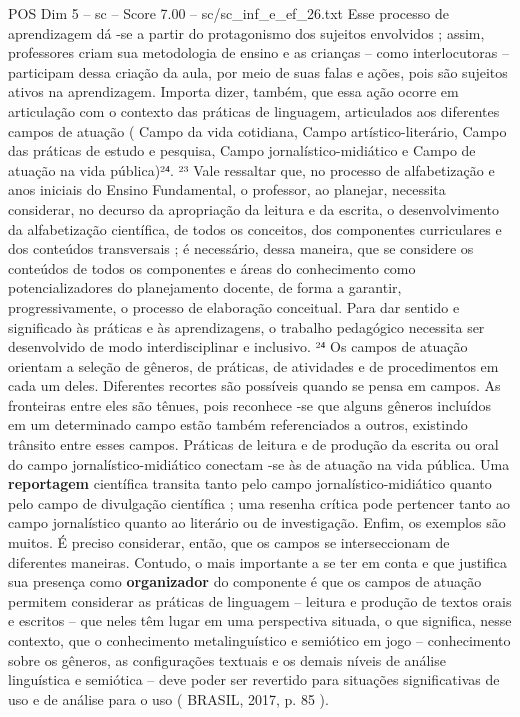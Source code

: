 \begin{textsample}{POS Dim 5 – sc – Score 7.00 – sc/sc\_inf\_e\_ef\_26.txt}
Esse processo de aprendizagem dá -se a partir do protagonismo dos sujeitos envolvidos ; assim, professores criam sua metodologia de ensino e as crianças – como interlocutoras – participam dessa criação da aula, por meio de suas falas e ações, pois são sujeitos ativos na aprendizagem.
Importa dizer, também, que essa ação ocorre em articulação com o contexto das práticas de linguagem, articulados aos diferentes campos de atuação ( Campo da vida cotidiana, Campo artístico-literário, Campo das práticas de estudo e pesquisa, Campo jornalístico-midiático e Campo de atuação na vida pública)²⁴. ²³ Vale ressaltar que, no processo de alfabetização e anos iniciais do Ensino Fundamental, o professor, ao planejar, necessita considerar, no decurso da apropriação da leitura e da escrita, o desenvolvimento da alfabetização científica, de todos os conceitos, dos componentes curriculares e dos conteúdos transversais ; é necessário, dessa maneira, que se considere os conteúdos de todos os componentes e áreas do conhecimento como potencializadores do planejamento docente, de forma a garantir, progressivamente, o processo de elaboração conceitual.
Para dar sentido e significado às práticas e às aprendizagens, o trabalho pedagógico necessita ser desenvolvido de modo interdisciplinar e inclusivo. ²⁴ Os campos de atuação orientam a seleção de gêneros, de práticas, de atividades e de procedimentos em cada um deles.
Diferentes recortes são possíveis quando se pensa em campos.
As fronteiras entre eles são tênues, pois reconhece -se que alguns gêneros incluídos em um determinado campo estão também referenciados a outros, existindo trânsito entre esses campos.
Práticas de leitura e de produção da escrita ou oral do campo jornalístico-midiático conectam -se às de atuação na vida pública.
Uma \textbf{reportagem} científica transita tanto pelo campo jornalístico-midiático quanto pelo campo de divulgação científica ; uma resenha crítica pode pertencer tanto ao campo jornalístico quanto ao literário ou de investigação.
Enfim, os exemplos são muitos.
É preciso considerar, então, que os campos se interseccionam de diferentes maneiras.
Contudo, o mais importante a se ter em conta e que justifica sua presença como \textbf{organizador} do componente é que os campos de atuação permitem considerar as práticas de linguagem – leitura e produção de textos orais e escritos – que neles têm lugar em uma perspectiva situada, o que significa, nesse contexto, que o conhecimento metalinguístico e semiótico em jogo – conhecimento sobre os gêneros, as configurações textuais e os demais níveis de análise linguística e semiótica – deve poder ser revertido para situações significativas de uso e de análise para o uso ( BRASIL, 2017, p. 85 ).

\end{textsample}
